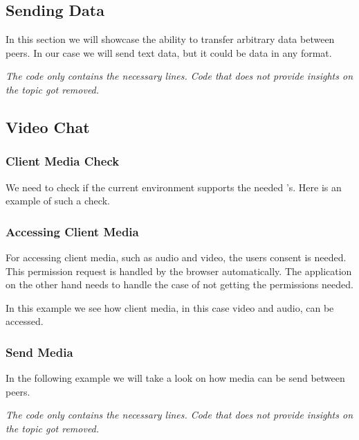 \subsection{Sending Data}
In this section we will showcase the ability to transfer arbitrary data between peers. In our case we will send text data, but it could be data in any format.

\textit{The code only contains the necessary lines. Code that does not provide insights on the topic got removed.}


\subsection{Video Chat}

\subsubsection{Client Media Check}
We need to check if the current environment supports the needed 's. Here is an example of such a check.


\subsubsection{Accessing Client Media}
For accessing client media, such as audio and video, the users consent is needed. This permission request is handled by the browser automatically. The application on the other hand needs to handle the case of not getting the permissions needed.

In this example we see how client media, in this case video and audio, can be accessed.


\subsubsection{Send Media}
In the following example we will take a look on how media can be send between peers.

\textit{The code only contains the necessary lines. Code that does not provide insights on the topic got removed.}


